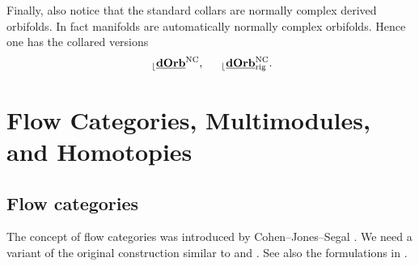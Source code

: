 \documentclass[reqno, 10pt]{amsart}
\numberwithin{equation}{section}
\numberwithin{equation}{section}
\theoremstyle{definition}
\theoremstyle{remark}
\renewcommand{\outer}{{}_{\lfloor}}
\newcommand{\uds}[1]{\underline{\smash{#1}}}
\begin{document}
Finally, also notice that the standard collars are normally complex derived orbifolds. In fact manifolds are automatically normally complex orbifolds. Hence one has the collared versions
\begin{align*}
&\ \outer \uds{\bf dOrb}^{{\rm NC}},\ &\ \outer \uds{\bf dOrb}^{{\rm NC}}_{\rm rig}.
\end{align*}



\section{Flow Categories, Multimodules, and Homotopies}


\subsection{Flow categories}

The concept of flow categories was introduced by Cohen--Jones--Segal \cite{Cohen_Jones_Segal}. We need a variant of the original construction similar to \cite[Section 7]{pardon-VFC} and \cite[Section 7,8]{Abouzaid_axiomatic}. See also the formulations in \cite{Bai_Xu_Arnold}. 
\end{document}
